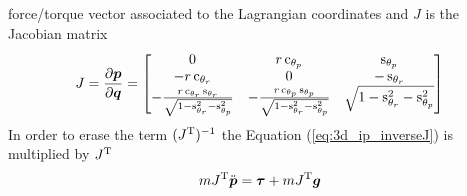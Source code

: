 force/torque vector associated to the Lagrangian coordinates and $J$ is the Jacobian matrix
\[
J = \frac{\partial \vec{p}}{\partial \vec{q}} =
\begin{bmatrix}
  0 & r \cosine{\theta_p} & \sine{\theta_p}\\
  -r\cosine{\theta_r} & 0 & - \sine{\theta_r}\\
  -\frac{r \cosine{\theta_r} \sine{\theta_r}}{\sqrt{1-\sine{\theta_r}^2-\sine{\theta_p}^2}} &   -\frac{r \cosine{\theta_p} \sine{\theta_p}}{\sqrt{1-\sine{\theta_r}^2-\sine{\theta_p}^2}} & \sqrt{1-\sine{\theta_r}^2-\sine{\theta_p}^2}
\end{bmatrix}
\]
In order to erase the term $(J^{\mathrm{T}})^{-1}$ the Equation (\ref{eq:3d_ip_inverseJ})
is multiplied by $J^{\mathrm{T}}$
\[
m J^{\mathrm{T}} \ddot{\boldsymbol{p}} = \boldsymbol{\tau} + m J^{\mathrm{T}} \boldsymbol{g}
\]

